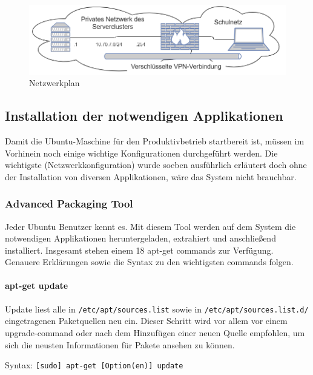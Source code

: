 \begin{figure}[ht]
\centering
\includegraphics{topo1.png}
\caption{Netzwerkplan}
\end{figure}

\hypertarget{installation-der-notwendigen-applikationen}{%
\subsection{Installation der notwendigen
Applikationen}\label{installation-der-notwendigen-applikationen}}

Damit die Ubuntu-Maschine für den Produktivbetrieb startbereit ist,
müssen im Vorhinein noch einige wichtige Konfigurationen durchgeführt
werden. Die wichtigste (Netzwerkkonfiguration) wurde soeben ausführlich
erläutert doch ohne der Installation von diversen Applikationen, wäre
das System nicht brauchbar.

\hypertarget{advanced-packaging-tool}{%
\subsubsection{Advanced Packaging Tool}\label{advanced-packaging-tool}}

Jeder Ubuntu Benutzer kennt es. Mit diesem Tool werden auf dem System
die notwendigen Applikationen heruntergeladen, extrahiert und
anschließend installiert. Insgesamt stehen einem 18 apt-get commands zur
Verfügung. Genauere Erklärungen sowie die Syntax zu den wichtigsten
commands folgen.

\hypertarget{apt-get-update}{%
\paragraph{apt-get update}\label{apt-get-update}}

Update liest alle in \texttt{/etc/apt/sources.list} sowie in
\texttt{/etc/apt/sources.list.d/} eingetragenen Paketquellen neu ein.
Dieser Schritt wird vor allem vor einem upgrade-command oder nach dem
Hinzufügen einer neuen Quelle empfohlen, um sich die neusten
Informationen für Pakete ansehen zu können.

Syntax: \texttt{{[}sudo{]}\ apt-get\ {[}Option(en){]}\ update}

